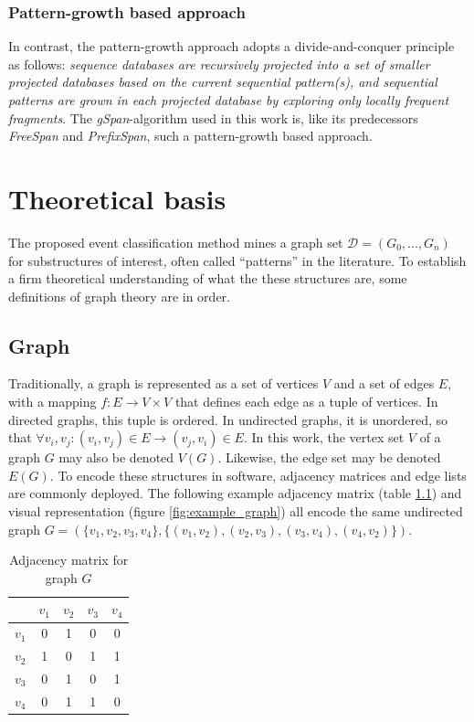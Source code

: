 \documentclass[pdftex,12pt,a4paper]{report}
\begin{document}
\subsection{Pattern-growth based approach}
In contrast, the pattern-growth approach adopts a divide-and-conquer principle as follows: \textit{sequence databases are recursively projected into a set of smaller projected databases based on the current sequential pattern(s), and sequential patterns are grown in each projected database by exploring only locally frequent fragments}.\cite{Han2004-qs} The \textit{gSpan}-algorithm used in this work is, like its predecessors \textit{FreeSpan} and \textit{PrefixSpan}, such a pattern-growth based approach.

\chapter{Theoretical basis}
\label{chapter:theoretical_basis}
The proposed event classification method mines a graph set $\mathcal{D} = (G_0, ..., G_n)$ for substructures of interest, often called ``patterns'' in the literature. To establish a firm theoretical understanding of what the these structures are, some definitions of graph theory are in order.

\section{Graph}
Traditionally, a graph is represented as a set of vertices $V$ and a set of edges $E$, with a mapping $f : E \rightarrow V \times V$ that defines each edge as a tuple of vertices. In directed graphs, this tuple is ordered. In undirected graphs, it is unordered, so that $\forall v_i, v_j: (v_i, v_j) \in E \rightarrow (v_j, v_i) \in E$. In this work, the vertex set $V$ of a graph $G$ may also be denoted $V(G)$. Likewise, the edge set may be denoted $E(G)$. To encode these structures in software, adjacency matrices and edge lists are commonly deployed. The following example adjacency matrix (table \ref{tab:example_adj_mat}) and visual representation (figure \ref{fig:example_graph}) all encode the same undirected graph $G = \left(\{v_1, v_2, v_3, v_4\}, \{(v_1, v_2), (v_2,v_3), (v_3, v_4), (v_4, v_2)\}\right)$.

\begin{table}
	\caption{Adjacency matrix for graph $G$}
	\label{tab:example_adj_mat}
	\centering
	\begin{tabular}{l|cccc}
		      & $v_1$ & $v_2$ & $v_3$ & $v_4$ \\ \hline
		$v_1$ &   0   &   1   &   0   &   0    \\
		$v_2$ &   1   &   0   &   1   &   1   \\
		$v_3$ &   0   &   1   &   0   &   1   \\
		$v_4$ &   0   &   1   &   1   &   0
	\end{tabular}
\end{table}
\end{document}
